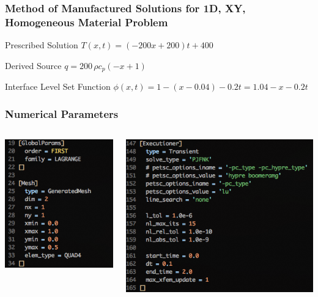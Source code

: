 \documentclass[]{beamer}
\begin{document}
\begin{frame}[t]\frametitle{Method of Manufactured Solutions for 1D, XY, Homogeneous Material Problem}
\begin{block}{Prescribed Solution}
    $T(x,t) = (-200x+200)t + 400$
  \end{block}
  
  \begin{block}{Derived Source}
  $q = 200\,\rho c_p \left(-x+1\right)$
  \end{block}
  
  \begin{block}{Interface Level Set Function}
    $\phi(x,t) = 1 - (x - 0.04) - 0.2t = 1.04 - x - 0.2t$
  \end{block}
\end{frame}

\begin{frame}\frametitle{Numerical Parameters}
  	\begin{columns}
			\begin{center}
			\includegraphics[scale=0.4]{figures/Screen-GlobalParams-1Dxyh1m}
			\end{center}
			\begin{center}
			\includegraphics[scale=0.4]{figures/Screen-Executioner-1Dxyh1m}

\end{center}
\end{columns}
\end{frame}
\end{document}
